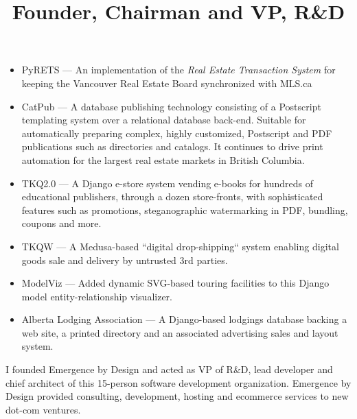 \documentclass[line,margin]{res}
\begin{document}
\begin{resume}
\begin{position}
\begin{itemize}
  \item PyRETS --- An implementation of the \emph{Real Estate Transaction System}
  for keeping the Vancouver Real Estate Board synchronized with MLS.ca

  \item CatPub --- A database publishing technology consisting of a
  Postscript templating system over a relational database back-end.
  Suitable for automatically preparing complex, highly customized,
  Postscript and PDF publications such as directories and catalogs.
  It continues to drive print automation for the largest real estate
  markets in British Columbia.

  \item TKQ2.0 --- A Django e-store system vending e-books for hundreds
  of educational publishers, through a dozen store-fronts, with sophisticated
  features such as promotions, steganographic watermarking in PDF, bundling,
  coupons and more.

  \item TKQW --- A Medusa-based ``digital drop-shipping`` system
  enabling digital goods sale and delivery by untrusted 3rd parties.

  \item ModelViz --- Added dynamic SVG-based touring facilities to this Django
  model entity-relationship visualizer.

  \item Alberta Lodging Association --- A Django-based lodgings database
  backing a web site, a printed directory and an associated advertising
  sales and layout system.

\end{itemize}

\end{position}



\title{ Founder, Chairman and VP, R\&D }

\begin{position}
  I founded Emergence by Design and acted as
  VP of R\&D, lead developer and chief architect of this 15-person
  software development organization.
  Emergence by Design provided consulting, development, hosting and
  ecommerce services to new dot-com ventures.

\begin{itemize}


\end{itemize}
\end{position}
\end{resume}
\end{document}
